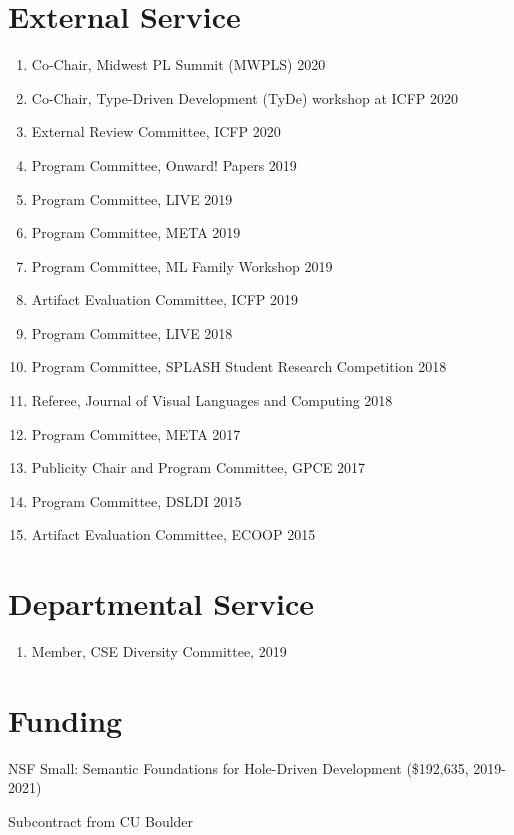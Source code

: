\documentclass[10pt,letterpaper]{article}
\renewenvironment{itemize}{
  \begin{list}{}{
    \setlength{\leftmargin}{1.25em}
    \setlength{\itemsep}{0.25em}
    \setlength{\parskip}{0pt}
    \setlength{\parsep}{0.2em}
  }
}{
  \end{list}
}
\begin{document}
\section*{External Service}
\begin{enumerate}
  \item Co-Chair, Midwest PL Summit (MWPLS) 2020
  \item Co-Chair, Type-Driven Development (TyDe) workshop at ICFP 2020
  \item External Review Committee, ICFP 2020
  \item Program Committee, Onward! Papers 2019	
  \item Program Committee, LIVE 2019
  \item Program Committee, META 2019
  \item Program Committee, ML Family Workshop 2019
  \item Artifact Evaluation Committee, ICFP 2019
  \item Program Committee, LIVE 2018
  \item Program Committee, SPLASH Student Research Competition 2018
  \item Referee, Journal of Visual Languages and Computing 2018
  \item Program Committee, META 2017
  \item Publicity Chair and Program Committee, GPCE 2017
  \item Program Committee, DSLDI 2015
  \item Artifact Evaluation Committee, ECOOP 2015
\end{enumerate}

\section*{Departmental Service}
\begin{enumerate}
  \item Member, CSE Diversity Committee, 2019
\end{enumerate}


\section*{Funding}

\begin{itemize}
  \item NSF Small: Semantic Foundations for Hole-Driven Development (\$192,635, 2019-2021)
    \begin{itemize}
      \item Subcontract from CU Boulder
    \end{itemize}
\end{itemize}
\end{document}

